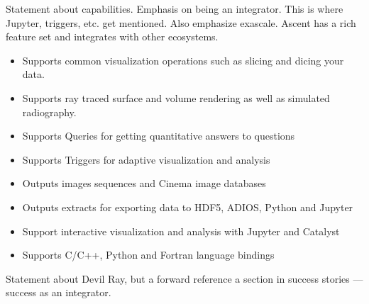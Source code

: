 \documentclass[graybox]{svmult}
\begin{document}
Statement about capabilities.  Emphasis on being an integrator.
This is where Jupyter, triggers, etc. get mentioned.  Also emphasize
exascale.
Ascent has a rich feature set and integrates with other ecosystems.

\begin{itemize}
  \item Supports common visualization operations such as slicing and dicing your data.
  \item Supports ray traced surface and volume rendering as well as simulated radiography.
  \item Supports Queries for getting quantitative answers to questions
  \item Supports Triggers for adaptive visualization and analysis
  \item Outputs images sequences and Cinema image databases
  \item Outputs extracts for exporting data to HDF5, ADIOS, Python and Jupyter
  \item Support interactive visualization and analysis with Jupyter and Catalyst
  \item Supports C/C++, Python and Fortran language bindings
\end{itemize}

Statement about Devil Ray, but a forward reference a section in success stories --- success as an integrator.
\fi




%


%

%




\end{document}
